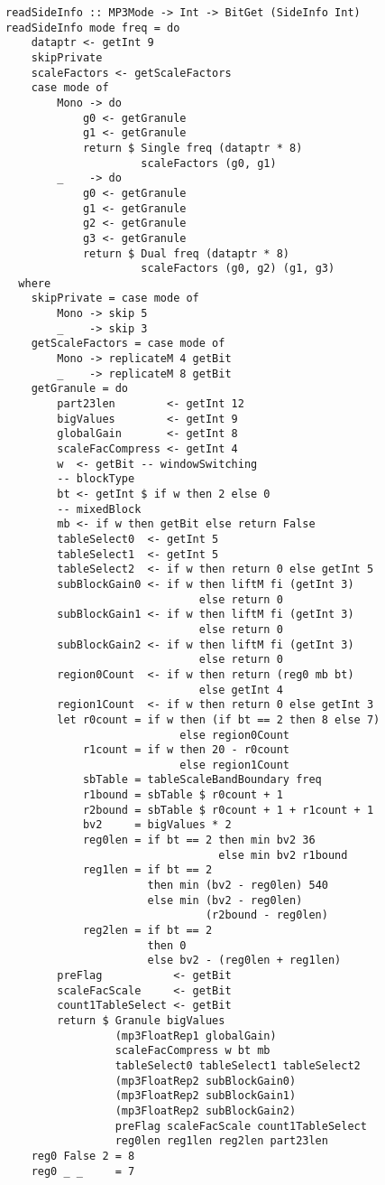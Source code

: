 \documentclass[a4paper,12pt]{article}
\begin{document}
    \begin{lstlisting}
readSideInfo :: MP3Mode -> Int -> BitGet (SideInfo Int)
readSideInfo mode freq = do
    dataptr <- getInt 9
    skipPrivate
    scaleFactors <- getScaleFactors
    case mode of
        Mono -> do 
            g0 <- getGranule
            g1 <- getGranule
            return $ Single freq (dataptr * 8) 
                     scaleFactors (g0, g1)
        _    -> do 
            g0 <- getGranule
            g1 <- getGranule
            g2 <- getGranule
            g3 <- getGranule
            return $ Dual freq (dataptr * 8) 
                     scaleFactors (g0, g2) (g1, g3)
  where
    skipPrivate = case mode of
        Mono -> skip 5
        _    -> skip 3
    getScaleFactors = case mode of
        Mono -> replicateM 4 getBit
        _    -> replicateM 8 getBit
    getGranule = do
        part23len        <- getInt 12
        bigValues        <- getInt 9
        globalGain       <- getInt 8
        scaleFacCompress <- getInt 4
        w  <- getBit -- windowSwitching
        -- blockType
        bt <- getInt $ if w then 2 else 0
        -- mixedBlock
        mb <- if w then getBit else return False
        tableSelect0  <- getInt 5
        tableSelect1  <- getInt 5
        tableSelect2  <- if w then return 0 else getInt 5
        subBlockGain0 <- if w then liftM fi (getInt 3) 
                              else return 0
        subBlockGain1 <- if w then liftM fi (getInt 3) 
                              else return 0
        subBlockGain2 <- if w then liftM fi (getInt 3) 
                              else return 0
        region0Count  <- if w then return (reg0 mb bt)
                              else getInt 4
        region1Count  <- if w then return 0 else getInt 3
        let r0count = if w then (if bt == 2 then 8 else 7)
                           else region0Count
            r1count = if w then 20 - r0count
                           else region1Count
            sbTable = tableScaleBandBoundary freq
            r1bound = sbTable $ r0count + 1
            r2bound = sbTable $ r0count + 1 + r1count + 1
            bv2     = bigValues * 2
            reg0len = if bt == 2 then min bv2 36
                                 else min bv2 r1bound
            reg1len = if bt == 2 
                      then min (bv2 - reg0len) 540 
                      else min (bv2 - reg0len) 
                               (r2bound - reg0len) 
            reg2len = if bt == 2 
                      then 0   
                      else bv2 - (reg0len + reg1len)
        preFlag           <- getBit
        scaleFacScale     <- getBit
        count1TableSelect <- getBit
        return $ Granule bigValues 
                 (mp3FloatRep1 globalGain)
                 scaleFacCompress w bt mb 
                 tableSelect0 tableSelect1 tableSelect2
                 (mp3FloatRep2 subBlockGain0)
                 (mp3FloatRep2 subBlockGain1)
                 (mp3FloatRep2 subBlockGain2)
                 preFlag scaleFacScale count1TableSelect
                 reg0len reg1len reg2len part23len
    reg0 False 2 = 8
    reg0 _ _     = 7

    \end{lstlisting}
\end{document}
